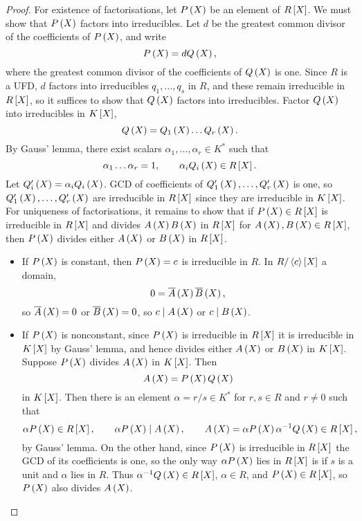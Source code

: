 \begin{proof}
For existence of factorisations, let $ P\br{X} $ be an element of $ R\sbr{X} $. We must show that $ P\br{X} $ factors into irreducibles. Let $ d $ be the greatest common divisor of the coefficients of $ P\br{X} $, and write
$$ P\br{X} = dQ\br{X}, $$
where the greatest common divisor of the coefficients of $ Q\br{X} $ is one. Since $ R $ is a UFD, $ d $ factors into irreducibles $ q_1, \dots, q_s $ in $ R $, and these remain irreducible in $ R\sbr{X} $, so it suffices to show that $ Q\br{X} $ factors into irreducibles. Factor $ Q\br{X} $ into irreducibles in $ K\sbr{X} $,
$$ Q\br{X} = Q_1\br{X} \dots Q_r\br{X}. $$
By Gauss' lemma, there exist scalars $ \alpha_1, \dots, \alpha_r \in K^* $ such that
$$ \alpha_1 \dots \alpha_r = 1, \qquad \alpha_iQ_i\br{X} \in R\sbr{X}. $$
Let $ Q'_i \br{X} = \alpha_iQ_i\br{X} $. GCD of coefficients of $ Q'_1\br{X}, \dots, Q'_r\br{X} $ is one, so $ Q'_1\br{X}, \dots, Q'_r\br{X} $ are irreducible in $ R\sbr{X} $ since they are irreducible in $ K\sbr{X} $. For uniqueness of factorisations, it remains to show that if $ P\br{X} \in R\sbr{X} $ is irreducible in $ R\sbr{X} $ and divides $ A\br{X}B\br{X} $ in $ R\sbr{X} $ for $ A\br{X}, B\br{X} \in R\sbr{X} $, then $ P\br{X} $ divides either $ A\br{X} $ or $ B\br{X} $ in $ R\sbr{X} $.
\begin{itemize}
\item If $ P\br{X} $ is constant, then $ P\br{X} = c $ is irreducible in $ R $. In $ R / \abr{c}\sbr{X} $ a domain,
$$ 0 = \overline{A}\br{X}\overline{B}\br{X}, $$
so $ \overline{A}\br{X} = 0 $ or $ \overline{B}\br{X} = 0 $, so $ c \mid A\br{X} $ or $ c \mid B\br{X} $.
\item If $ P\br{X} $ is nonconstant, since $ P\br{X} $ is irreducible in $ R\sbr{X} $ it is irreducible in $ K\sbr{X} $ by Gauss' lemma, and hence divides either $ A\br{X} $ or $ B\br{X} $ in $ K\sbr{X} $. Suppose $ P\br{X} $ divides $ A\br{X} $ in $ K\sbr{X} $. Then
$$ A\br{X} = P\br{X}Q\br{X} $$
in $ K\sbr{X} $. Then there is an element $ \alpha = r / s \in K^* $ for $ r, s \in R $ and $ r \ne 0 $ such that
$$ \alpha P\br{X} \in R\sbr{X}, \qquad \alpha P\br{X} \mid A\br{X}, \qquad A\br{X} = \alpha P\br{X}\alpha^{-1} Q\br{X} \in R\sbr{X}, $$
by Gauss' lemma. On the other hand, since $ P\br{X} $ is irreducible in $ R\sbr{X} $ the GCD of its coefficients is one, so the only way $ \alpha P\br{X} $ lies in $ R\sbr{X} $ is if $ s $ is a unit and $ \alpha $ lies in $ R $. Thus $ \alpha^{-1}Q\br{X} \in R\sbr{X} $, $ \alpha \in R $, and $ P\br{X} \in R\sbr{X} $, so $ P\br{X} $ also divides $ A\br{X} $.
\end{itemize}
\end{proof}

